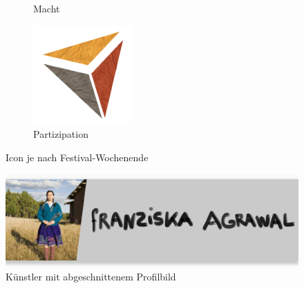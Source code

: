 \begin{figure}
\begin{subfigure}[t]{0.3\columnwidth}
        \caption{Macht}
        \label{fig:macht}
    \end{subfigure}
    \begin{subfigure}[t]{0.3\columnwidth}
        \includegraphics[width=\textwidth]{figures/i_partizipation}
        \caption{Partizipation}
        \label{fig:parti}
    \end{subfigure}
    \caption{Icon je nach Festival-Wochenende}
    \label{fig:icons}
\end{figure}

\begin{figure}[ht]
    \centering
        \includegraphics[width=.4\textwidth]{figures/kuenstler_item.png}
    \caption{Künstler mit abgeschnittenem Profilbild}
    \label{fig:kuenstler_item}
\end{figure}